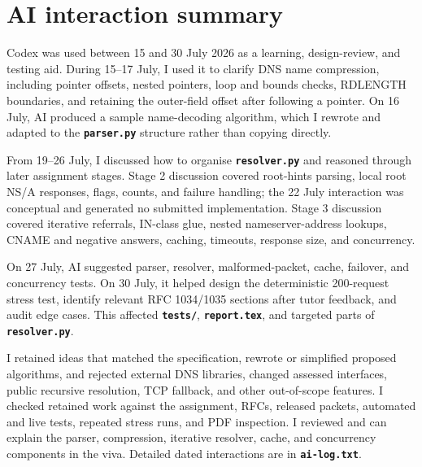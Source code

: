 \documentclass[11pt,a4paper]{article}
\newcommand{\program}[1]{\texttt{\textbf{#1}}}
\begin{document}
\section{AI interaction summary}

Codex was used between 15 and 30 July 2026 as a learning, design-review, and
testing aid. During 15--17 July, I used it to clarify DNS name compression,
including pointer offsets, nested pointers, loop and bounds checks, RDLENGTH
boundaries, and retaining the outer-field offset after following a pointer. On
16 July, AI produced a sample name-decoding algorithm, which I rewrote and
adapted to the \program{parser.py} structure rather than copying directly.

From 19--26 July, I discussed how to organise \program{resolver.py} and reasoned
through later assignment stages. Stage 2 discussion covered root-hints parsing,
local root NS/A responses, flags, counts, and failure handling; the 22 July
interaction was conceptual and generated no submitted implementation. Stage 3
discussion covered iterative referrals, IN-class glue, nested nameserver-address
lookups, CNAME and negative answers, caching, timeouts, response size, and
concurrency.

On 27 July, AI suggested parser, resolver, malformed-packet, cache, failover, and
concurrency tests. On 30 July, it helped design the deterministic 200-request
stress test, identify relevant RFC 1034/1035 sections after tutor feedback, and
audit edge cases. This affected \program{tests/}, \program{report.tex}, and
targeted parts of \program{resolver.py}.

I retained ideas that matched the specification, rewrote or simplified proposed
algorithms, and rejected external DNS libraries, changed assessed interfaces,
public recursive resolution, TCP fallback, and other out-of-scope features. I
checked retained work against the assignment, RFCs, released packets, automated
and live tests, repeated stress runs, and PDF inspection. I reviewed and can
explain the parser, compression, iterative resolver, cache, and concurrency
components in the viva. Detailed dated interactions are in
\program{ai-log.txt}.
\end{document}
